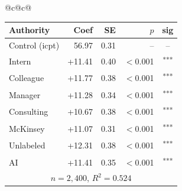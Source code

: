 \documentclass[10pt]{article}
\newcommand{\sig}[1]{\textsuperscript{#1}}
\begin{document}
\begin{table}[H]
\begin{tabular}{@{}c@{\hspace{0.5em}}c@{}}
\begin{minipage}[t]{0.49\textwidth}
\begin{tabular}{@{}l r r r c@{}}
\toprule
Authority & Coef & SE & $p$ & sig \\
\midrule
\cellcolor{gray!22}Control (icpt) & \cellcolor{gray!22}56.97 & \cellcolor{gray!22}0.31 & \cellcolor{gray!22}-- & \cellcolor{gray!22}-- \\
\midrule
Intern & +11.41 & 0.40 & $<$0.001 & \sig{***} \\
Colleague & +11.77 & 0.38 & $<$0.001 & \sig{***} \\
Manager & +11.28 & 0.34 & $<$0.001 & \sig{***} \\
\midrule
Consulting & +10.67 & 0.38 & $<$0.001 & \sig{***} \\
McKinsey & +11.07 & 0.31 & $<$0.001 & \sig{***} \\
\midrule
Unlabeled & +12.31 & 0.38 & $<$0.001 & \sig{***} \\
AI & +11.41 & 0.35 & $<$0.001 & \sig{***} \\
\midrule
\multicolumn{5}{c}{\scriptsize $n=2{,}400$, $R^2=0.524$} \\
\bottomrule\end{tabular}
\end{minipage} \\
\end{tabular}
\end{table}
\end{document}
